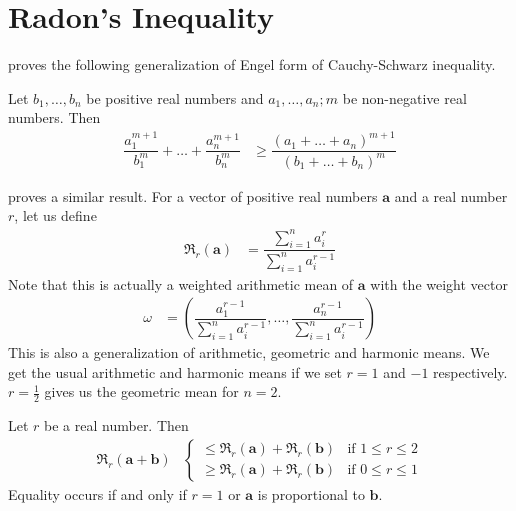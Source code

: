 \documentclass[inequalities.tex]{subfile}
\begin{document}
	\section{Radon's Inequality}\label{sec:radon}
	 \textcite{johann_radon_1913} proves the following generalization of Engel form of Cauchy-Schwarz inequality.
		\begin{theorem}\label{thm:radon}
			Let $b_{1},\ldots,b_{n}$ be positive real numbers and $a_{1},\ldots,a_{n};m$ be non-negative real numbers. Then
				\begin{align*}
					\dfrac{a_{1}^{m+1}}{b_{1}^{m}}+\ldots+\dfrac{a_{n}^{m+1}}{b_{n}^{m}}
						& \geq \dfrac{(a_{1}+\ldots+a_{n})^{m+1}}{(b_{1}+\ldots+b_{n})^{m}}
				\end{align*}
		\end{theorem}
	\textcite{beckenbach_1950} proves a similar result. For a vector of positive real numbers $\mathbf{a}$ and a real number $r$, let us define
		\begin{align*}
			\mathfrak{R}_{r}(\mathbf{a})
				& = \dfrac{\sum\limits_{i=1}^{n}a_{i}^{r}}{\sum\limits_{i=1}^{n}a_{i}^{r-1}}
		\end{align*}
	Note that this is actually a weighted arithmetic mean of $\mathbf{a}$ with the weight vector
		\begin{align*}
			\omega
				& = \left(\dfrac{a_{1}^{r-1}}{\sum\limits_{i=1}^{n}a_{i}^{r-1}},\ldots,\dfrac{a_{n}^{r-1}}{\sum\limits_{i=1}^{n}a_{i}^{r-1}}\right)
		\end{align*}
	This is also a generalization of arithmetic, geometric and harmonic means. We get the usual arithmetic and harmonic means if we set $r=1$ and $-1$ respectively. $r=\frac{1}{2}$ gives us the geometric mean for $n=2$.
		\begin{theorem}\label{thm:beckenbach}
			Let $r$ be a real number. Then
				\begin{align*}
					\mathfrak{R}_{r}(\mathbf{a}+\mathbf{b})
						& 
							\begin{cases}
								\leq \mathfrak{R}_{r}(\mathbf{a})+\mathfrak{R}_{r}(\mathbf{b}) &\mbox{if }1\leq r\leq 2\\
								\geq \mathfrak{R}_{r}(\mathbf{a})+\mathfrak{R}_{r}(\mathbf{b}) &\mbox{if }0\leq r\leq 1 
							\end{cases}
				\end{align*}
			Equality occurs if and only if $r=1$ or $\mathbf{a}$ is proportional to $\mathbf{b}$.
		\end{theorem}
\end{document}
